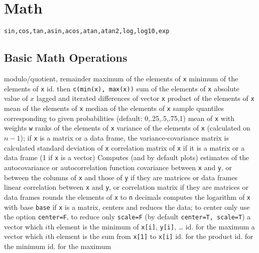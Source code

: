 \section{Math}{{\tt sin,cos,tan,asin,acos,atan,atan2,log,log10,exp}}

\subsection{Basic Math Operations}{}
\cmdS{\%\%, \%/\%}	{modulo/quotient, remainder}
	{ maximum of the elements of {\tt x}}
	{ minimum of the elements of {\tt x}}
	{ id. then {\tt c(min(x), max(x))}}
	{ sum of the elements of {\tt x}}
	{absolute value of $x$}
	{ lagged and iterated differences of vector {\tt x}}
	{ product of the elements of {\tt x}}
	{ mean of the elements of {\tt x}}
	{ median of the elements of {\tt x}}
	{sample quantiles corresponding to given
    probabilities (default: 0,.25,.5,.75,1)}
	{mean of {\tt x} with weights {\tt w}}
	{ ranks of the elements of {\tt x}}
	{variance of the elements of {\tt x}
    (calculated on $n-1$); if {\tt x} is a matrix or a data frame, the
    variance-covariance matrix is calculated}
	{standard deviation of {\tt x}}
	{correlation matrix of {\tt x} if it is a matrix or a data frame (1 if {\tt x} is a vector)}
	{Computes (and by default plots) estimates of the autocovariance or autocorrelation function}
	{covariance between {\tt x} and {\tt y}, or between the columns of {\tt x} and those of {\tt y} if they are matrices or data frames}
	{linear correlation between {\tt x} and {\tt y}, or correlation matrix if they are matrices or data frames}
	{rounds the elements of {\tt x} to {\tt n} decimals}
	{computes the logarithm of {\tt x} with base {\tt base}}
	{if {\tt x} is a matrix, centers and reduces the data; to
center only use the option {\tt center=F}, to reduce only {\tt scale=F}
(by default {\tt center=T, scale=T})}
	{ a vector which $i$th element is the minimum of {\tt x[i]}, {\tt y[i]}, \ldots}
	{ id. for the maximum}
	{a vector which $i$th element is the sum from {\tt x[1]} to {\tt x[i]}}
	{ id. for the product}
	{ id. for the minimum}
	{ id. for the maximum}


